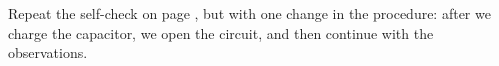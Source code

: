   Repeat the self-check on page \pageref{sc:withdraw-dielectric}, but with one change in the procedure: after we charge the capacitor,
  we open the circuit, and then continue with the observations.
